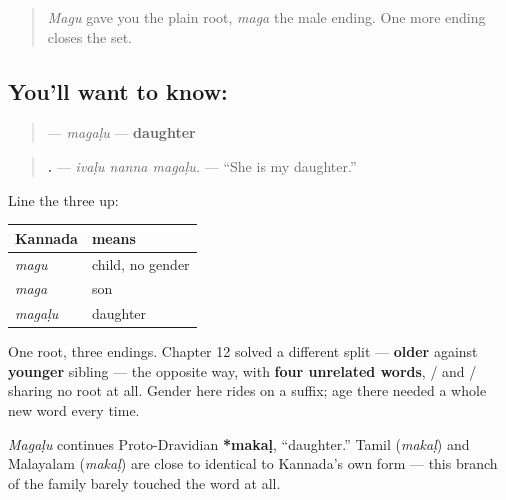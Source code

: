 \label{lesson:KA-C36-magalu}



\begin{quote}
\emph{Magu} gave you the plain root, \emph{maga} the male ending. One more ending closes the set.
\end{quote}

\subsection*{You'll want to know: }
\begin{quote}
\textbf{} — \emph{magaḷu} — \textbf{daughter}
\end{quote}

\begin{quote}
\textbf{  .} — \emph{ivaḷu nanna magaḷu.} — \textquotedblleft{}She is my daughter.\textquotedblright{}
\end{quote}

\begin{grammarlens}[title={Grammar Lens: gender by ending, not by a new word}]
Line the three up:

\noindent
\begin{tabularx}{\linewidth}{@{}>{\raggedright\arraybackslash}X>{\raggedright\arraybackslash}X@{}}
\toprule
\textbf{Kannada} & \textbf{means} \\
\midrule
\textbf{\kn{ಮಗು}} \emph{magu} & child, no gender \\
\textbf{\kn{ಮಗ}} \emph{maga} & son \\
\textbf{\kn{ಮಗಳು}} \emph{magaḷu} & daughter \\
\bottomrule
\end{tabularx}

One root, three endings. Chapter 12 solved a different split — \textbf{older} against \textbf{younger} sibling — the opposite way, with \textbf{four unrelated words}, / and / sharing no root at all. Gender here rides on a suffix; age there needed a whole new word every time.
\end{grammarlens}

\begin{cousinweb}
\emph{Magaḷu} continues Proto-Dravidian \textbf{*makaḷ}, \textquotedblleft{}daughter.\textquotedblright{} Tamil \textbf{} (\emph{makaḷ}) and Malayalam \textbf{} (\emph{makaḷ}) are close to identical to Kannada's own form — this branch of the family barely touched the word at all.
\end{cousinweb}

